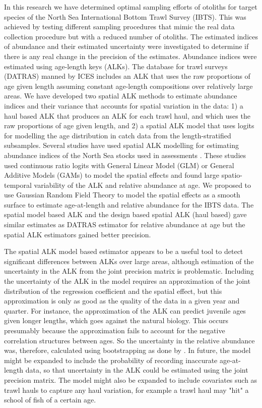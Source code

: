 \documentclass[a4paper 12pt]{article}
\numberwithin{equation}{section}
\begin{document}
In this research we have determined optimal sampling efforts of otoliths for target species of the North Sea International Bottom Trawl Survey (IBTS). This was achieved by testing different sampling procedures that mimic the real data collection procedure but with a reduced number of otoliths. The estimated indices of abundance and their estimated uncertainty were investigated to determine if there is any real change in the precision of the estimates. Abundance indices were estimated using age-length keys (ALKs). The database for trawl surveys (DATRAS) manned by ICES includes an ALK that uses the raw proportions of age given length assuming constant age-length compositions over relatively large areas. We have developed two spatial ALK methods  to estimate abundance indices and their variance that accounts for spatial variation in the data: 1) a haul based ALK that produces an ALK for each trawl haul, and which uses the raw proportions of age given length, and 2) a spatial ALK model that uses logits for modelling the age distribution in catch data from the length-stratified  subsamples. Several studies have used spatial ALK modelling for estimating abundance indices of the North Sea stocks used in  assessments \citep{berg2012spatial, berg2014evaluation, gerritsen2006simple}. These studies used continuous ratio logits with General Linear Model (GLM) or General Additive Models (GAMs) to model the spatial effects and found large spatio-temporal variability of the ALK and relative abundance at age. We proposed to use Gaussian Random Field Theory to model the spatial effects as a smooth surface to estimate age-at-length and relative abundance for the IBTS data. The spatial model based ALK and the design based spatial ALK (haul based) gave similar estimates as DATRAS estimator for relative abundance at age but the spatial ALK estimators gained better precision. 



The spatial ALK model based estimator appears to be a useful tool to detect significant differences between ALKs over large areas, although estimation of the uncertainty in the ALK from the joint precision matrix is problematic. Including the uncertainty of the ALK in the model requires an approximation of the joint distribution of the regression coefficient and the spatial effect, but this approximation is only as good as the quality of the data in a given year and quarter. For instance, the approximation of the ALK can predict juvenile ages given longer lengths, which goes against the natural biology. This occurs presumably because the approximation fails to account for the negative correlation structures between ages. So the uncertainty in the relative abundance was, therefore, calculated using bootstrapping as done by \citet{berg2012spatial,berg2014evaluation}. In future, the model might be expanded to include the probability of recording inaccurate age-at-length data, so that uncertainty in the ALK could be estimated using the joint precision matrix. The model might also be expanded to include covariates such as trawl hauls to capture any haul variation, for example a trawl haul may "hit" a school of fish  of a certain age.
\end{document}
